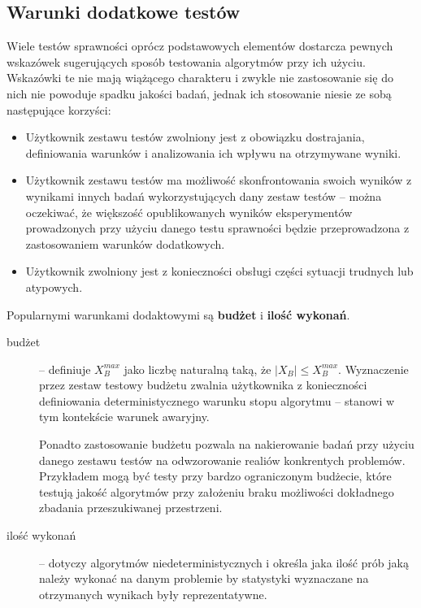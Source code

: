 \documentclass[12pt,a4paper]{report}
\begin{document}
{{{{\subsection{Warunki dodatkowe testów}
\par
{
Wiele testów sprawności oprócz podstawowych elementów dostarcza pewnych wskazówek sugerujących sposób testowania algorytmów przy ich użyciu. Wskazówki te nie mają wiążącego charakteru i zwykle nie zastosowanie się do nich nie powoduje spadku jakości badań, jednak ich stosowanie niesie ze sobą następujące korzyści:
\begin{itemize}
\item Użytkownik zestawu testów zwolniony jest z obowiązku dostrajania, definiowania warunków i analizowania ich wpływu na otrzymywane wyniki.
\item Użytkownik zestawu testów ma możliwość skonfrontowania swoich wyników z wynikami innych badań wykorzystujących dany zestaw testów -- można oczekiwać, że większość opublikowanych wyników eksperymentów prowadzonych przy użyciu danego testu sprawności będzie przeprowadzona z zastosowaniem warunków dodatkowych.
\item Użytkownik zwolniony jest z konieczności obsługi części sytuacji trudnych lub atypowych.
\end{itemize}
}
\par{
Popularnymi warunkami dodaktowymi są \textbf{budżet} i \textbf{ilość wykonań}.
\begin{description}
\item[budżet] -- definiuje $X_{B}^{max}$ jako liczbę naturalną taką, że $|X_B| \le X_{B}^{max}$. Wyznaczenie przez zestaw testowy budżetu zwalnia użytkownika z konieczności definiowania deterministycznego warunku stopu algorytmu -- stanowi w tym kontekście warunek awaryjny.

Ponadto zastosowanie budżetu pozwala na nakierowanie badań przy użyciu danego zestawu testów na odwzorowanie realiów konkrentych problemów. Przykładem mogą być testy przy bardzo ograniczonym budżecie, które testują jakość algorytmów przy założeniu braku możliwości dokładnego zbadania przeszukiwanej przestrzeni.
\item[ilość wykonań] -- dotyczy algorytmów niedeterministycznych i określa jaka ilość prób jaką należy wykonać na danym problemie by statystyki wyznaczane na otrzymanych wynikach były reprezentatywne.
\end{description}
}
 
}}}}
\end{document}
